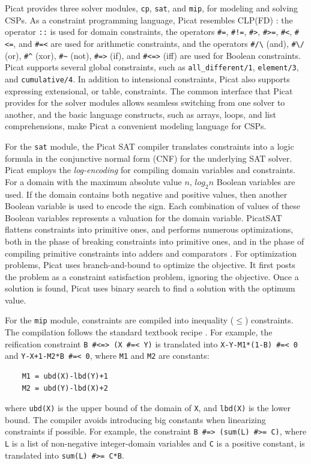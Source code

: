 \documentclass[conference]{IEEEtran}
\begin{document}
Picat provides three solver modules, \texttt{cp}, \texttt{sat}, and \texttt{mip}, for modeling and solving CSPs. As a constraint programming language, Picat resembles CLP(FD)
: the operator \verb+::+ is used for domain constraints, the operators \verb+#=+, \verb+#!=+, \verb+#>+, \verb+#>=+, \verb+#<+, \verb+#<=+, and \verb+#=<+ are used for arithmetic constraints, and the operators \verb+#/\+ (and), \verb+#\/+ (or), \verb+#^+ (xor), \verb+#~+ (not), \verb+#=>+ (if), and \verb+#<=>+ (iff) are used for Boolean constraints. Picat supports several global constraints, such as \texttt{all\_different/1}, \texttt{element/3}, and \texttt{cumulative/4}. In addition to intensional constraints, Picat also supports expressing extensional, or table, constraints. The common interface that Picat provides for the solver modules allows seamless switching from one solver to another, and the basic language constructs, such as arrays, loops, and list comprehensions, make Picat a convenient modeling language for CSPs.

For the \texttt{sat} module, the Picat SAT compiler \cite{ZhouK16,ZhouK17} translates constraints into a logic formula in the conjunctive normal form (CNF) for the underlying SAT solver.  Picat employs the \textit{log-encoding} for compiling domain variables and constraints.  For a domain with the maximum absolute value $n$, $log_2n$ Boolean variables are used. If the domain contains both negative and positive values, then another Boolean variable is used to encode the sign. Each combination of values of these Boolean variables represents a valuation for the domain variable. PicatSAT flattens constraints into primitive ones, and performs numerous optimizations, both in the phase of breaking constraints into primitive ones, and in the phase of compiling primitive constraints into adders and comparators \cite{ZhouK17}. For optimization problems, Picat uses branch-and-bound to optimize the objective. It first posts the problem as a constraint satisfaction problem, ignoring the objective. Once a solution is found, Picat uses binary search to find a solution with the optimum value.

For the {\tt mip} module, constraints are compiled into inequality ($\le$) constraints. The compilation follows the standard textbook recipe \cite{BertsimasW05}. For example, the reification constraint \verb&B #<=> (X #=< Y)& is translated into \verb&X-Y-M1*(1-B) #=< 0& and \verb&Y-X+1-M2*B #=< 0&, where {\tt M1} and {\tt M2} are constants:
\begin{small}
\begin{verbatim}
    M1 = ubd(X)-lbd(Y)+1
    M2 = ubd(Y)-lbd(X)+2
\end{verbatim}
\end{small}
where {\tt ubd(X)} is the upper bound of the domain of {\tt X}, and {\tt lbd(X)} is the lower bound. The compiler avoids introducing big constants when linearizing constraints if possible. For example, the constraint \verb&B #=> (sum(L) #>= C)&, where \texttt{L} is a list of non-negative integer-domain variables and \texttt{C} is a positive constant, is translated into \verb&sum(L) #>= C*B&. 
\end{document}
